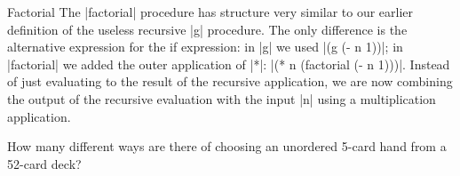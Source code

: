 \begin{schemeregion}
\begin{example}{Factorial}
The \scheme|factorial| procedure has structure very similar to our earlier definition of the useless recursive \scheme|g| procedure.  The only difference is the alternative expression for the if expression: in \scheme|g| we used \scheme|(g (- n 1))|; in \scheme|factorial| we added the outer application of \scheme|*|: 
\scheme|(* n (factorial (- n 1)))|.  Instead of just evaluating to the result of the recursive application, we are now combining the output of the recursive evaluation with the input \scheme|n| using a multiplication application.  
\end{example}

\beforeex
\begin{exercise}\label{ex:nchoosek}
How many different ways are there of choosing an unordered 5-card hand from a 52-card deck?  


\end{exercise}
\end{schemeregion}
